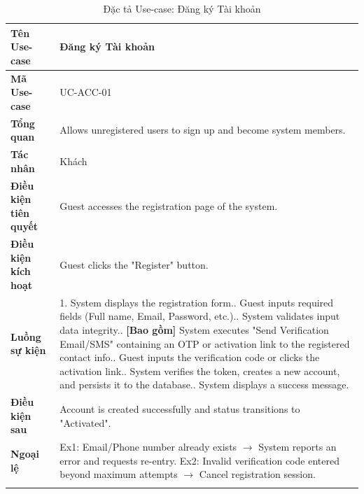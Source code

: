 \begin{longtable}{|p{3.5cm}|p{11.5cm}|}
    \hline
    \textbf{Tên Use-case} & \textbf{Đăng ký Tài khoản} \\
    \hline
    \textbf{Mã Use-case} & UC-ACC-01 \\
    \hline
    \textbf{Tổng quan} & Allows unregistered users to sign up and become system members. \\
    \hline
    \textbf{Tác nhân} & Khách \\
    \hline
    \textbf{Điều kiện tiên quyết} & Guest accesses the registration page of the system. \\
    \hline
    \textbf{Điều kiện kích hoạt} & Guest clicks the "Register" button. \\
    \hline
    \textbf{Luồng sự kiện} & 
    1. System displays the registration form.\newline
    2. Guest inputs required fields (Full name, Email, Password, etc.).\newline
    3. System validates input data integrity.\newline
    4. \textbf{[Bao gồm]} System executes "Send Verification Email/SMS" containing an OTP or activation link to the registered contact info.\newline
    5. Guest inputs the verification code or clicks the activation link.\newline
    6. System verifies the token, creates a new account, and persists it to the database.\newline
    7. System displays a success message. \\
    \hline
    \textbf{Điều kiện sau} & Account is created successfully and status transitions to "Activated". \\
    \hline
    \textbf{Ngoại lệ} & 
    Ex1: Email/Phone number already exists $\rightarrow$ System reports an error and requests re-entry.\newline
    Ex2: Invalid verification code entered beyond maximum attempts $\rightarrow$ Cancel registration session. \\
    \hline
    \caption{Đặc tả Use-case: Đăng ký Tài khoản}
\end{longtable}

